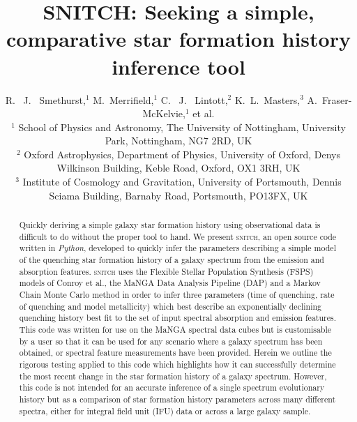 \documentclass[useAMS,usenatbib]{mn2e}
\begin{document}
\title[\textsc{snitch}: inferring quenching histories]{SNITCH: Seeking a simple, comparative star formation history inference tool}
\author[Smethurst et al. 2018]{R. ~J. ~Smethurst,$^{1}$ M.~Merrifield,$^{1}$ C. ~J. ~Lintott,$^{2}$ K.~L.~Masters,$^{3}$ \newauthor A.~Fraser-McKelvie,$^{1}$ et al.
\\ $^1$ School of Physics and Astronomy, The University of Nottingham, University Park, Nottingham, NG7 2RD, UK
\\ $^2$ Oxford Astrophysics, Department of Physics, University of Oxford, Denys Wilkinson Building, Keble Road, Oxford, OX1 3RH, UK
\\ $^3$ Institute of Cosmology and Gravitation, University of Portsmouth, Dennis Sciama Building, Barnaby Road, Portsmouth, PO13FX, UK
}

\maketitle

\begin{abstract}
Quickly deriving a simple galaxy star formation history using observational data is difficult to do without the proper tool to hand. We present \textsc{snitch}, an open source code written in \emph{Python}, developed to quickly infer the parameters describing a simple model of the quenching star formation history of a galaxy spectrum from the emission and absorption features. \textsc{snitch} uses the Flexible Stellar Population Synthesis (FSPS) models of Conroy et al., the MaNGA Data Analysis Pipeline (DAP) and a Markov Chain Monte Carlo method in order to infer three parameters (time of quenching, rate of quenching and model metallicity) which best describe an exponentially declining quenching history best fit to the set of input spectral absorption and emission features. This code was written for use on the MaNGA spectral data cubes but is customisable by a user so that it can be used for any scenario where a galaxy spectrum has been obtained, or spectral feature measurements have been provided. Herein we outline the rigorous testing applied to this code which highlights how it can successfully determine the most recent change in the star formation history of a galaxy spectrum. However, this code is not intended for an accurate inference of a single spectrum evolutionary history but as a comparison of star formation history parameters across many different spectra, either for integral field unit (IFU) data or across a large galaxy sample.
\end{abstract}
\end{document}
